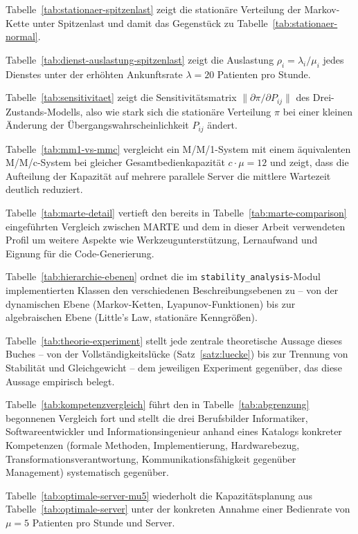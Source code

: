 ﻿\documentclass[a4paper,12pt]{report}
\theoremstyle{definition}
\begin{document}
Tabelle~\ref{tab:stationaer-spitzenlast} zeigt die stationäre Verteilung der Markov-Kette unter Spitzenlast und damit das Gegenstück zu Tabelle~\ref{tab:stationaer-normal}.

Tabelle~\ref{tab:dienst-auslastung-spitzenlast} zeigt die Auslastung $\rho_i = \lambda_i / \mu_i$ jedes Dienstes unter der erhöhten Ankunftsrate $\lambda = 20$ Patienten pro Stunde.

Tabelle~\ref{tab:sensitivitaet} zeigt die Sensitivitätsmatrix $\|\partial \pi / \partial P_{ij}\|$ des Drei-Zustands-Modells, also wie stark sich die stationäre Verteilung $\pi$ bei einer kleinen Änderung der Übergangswahrscheinlichkeit $P_{ij}$ ändert.

Tabelle~\ref{tab:mm1-vs-mmc} vergleicht ein M/M/1-System mit einem äquivalenten M/M/c-System bei gleicher Gesamtbedienkapazität $c \cdot \mu = 12$ und zeigt, dass die Aufteilung der Kapazität auf mehrere parallele Server die mittlere Wartezeit deutlich reduziert.

Tabelle~\ref{tab:marte-detail} vertieft den bereits in Tabelle~\ref{tab:marte-comparison} eingeführten Vergleich zwischen MARTE und dem in dieser Arbeit verwendeten Profil um weitere Aspekte wie Werkzeugunterstützung, Lernaufwand und Eignung für die Code-Generierung.

Tabelle~\ref{tab:hierarchie-ebenen} ordnet die im \texttt{stability\_analysis}-Modul implementierten Klassen den verschiedenen Beschreibungsebenen zu -- von der dynamischen Ebene (Markov-Ketten, Lyapunov-Funktionen) bis zur algebraischen Ebene (Little's Law, stationäre Kenngrößen).

Tabelle~\ref{tab:theorie-experiment} stellt jede zentrale theoretische Aussage dieses Buches -- von der Vollständigkeitslücke (Satz~\ref{satz:luecke}) bis zur Trennung von Stabilität und Gleichgewicht -- dem jeweiligen Experiment gegenüber, das diese Aussage empirisch belegt.

Tabelle~\ref{tab:kompetenzvergleich} führt den in Tabelle~\ref{tab:abgrenzung} begonnenen Vergleich fort und stellt die drei Berufsbilder Informatiker, Softwareentwickler und Informationsingenieur anhand eines Katalogs konkreter Kompetenzen (formale Methoden, Implementierung, Hardwarebezug, Transformationsverantwortung, Kommunikationsfähigkeit gegenüber Management) systematisch gegenüber.

Tabelle~\ref{tab:optimale-server-mu5} wiederholt die Kapazitätsplanung aus Tabelle~\ref{tab:optimale-server} unter der konkreten Annahme einer Bedienrate von $\mu = 5$ Patienten pro Stunde und Server.
\end{document}
